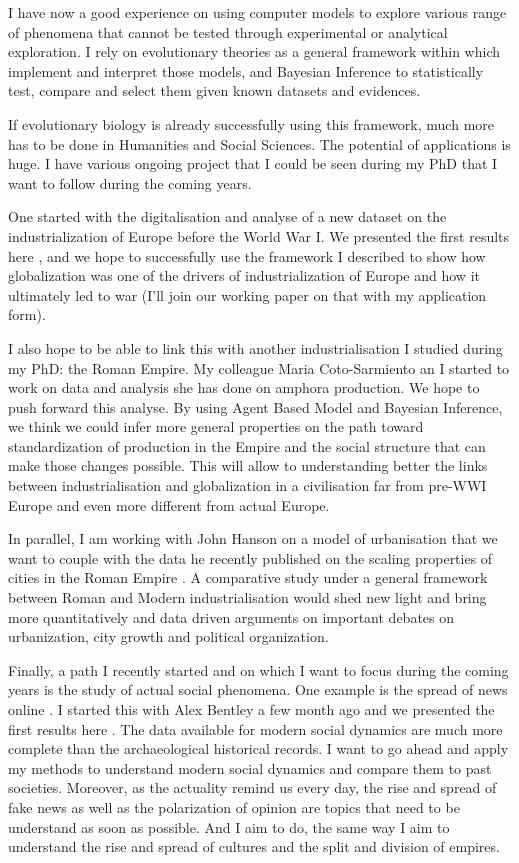\documentclass[10pt]{article}
\begin{document}
I have now a good experience on using computer models to explore various range of phenomena that cannot be tested through experimental or analytical exploration. I rely on evolutionary theories as a general framework within which implement and interpret those models, and Bayesian Inference to statistically test, compare and select them given known datasets and evidences.

If evolutionary biology is already successfully using this framework, much more has to be done in Humanities and Social Sciences. The potential of applications is huge. I have various ongoing project that I  could be seen   during my PhD that I want to follow during the coming years.

One started with the digitalisation and analyse of a new dataset on the industrialization of Europe before the World War I. We presented the first results here \cite{carrignon2016patternsinglobalization}, and we hope to successfully use the framework I described to show how globalization was one of the drivers of industrialization of Europe and how it ultimately led to war (I'll join our working paper on that with my application form).

I also hope to be able to link this with another industrialisation I studied during my PhD: the Roman Empire. My colleague Maria Coto-Sarmiento an I started to work on data and analysis she has done on amphora production\cite{COTOSARMIENTO2018117}. We hope to push forward this analyse. By using Agent Based Model and Bayesian Inference, we think we could infer more general properties on the path toward standardization of production in the Empire and the social structure that can make those changes possible.  This will allow to understanding better the links between industrialisation and globalization in a civilisation far from pre-WWI Europe and even more different from actual Europe.

In parallel, I am working with John Hanson on a model of urbanisation that we want to couple with the data he recently published on the scaling properties of cities in the Roman Empire \cite{Hanson20170367}. A comparative study under a general framework between Roman and Modern industrialisation would shed new light and bring more quantitatively and data driven arguments on important debates on urbanization, city growth and political organization.

Finally, a path I recently started and on which I want to focus during the coming years is the study of actual social phenomena.  One example is the spread of news online \cite{carrignon2018}. I started this with Alex Bentley a few month ago and we presented the first results here \cite{carrignon2018}. The data available for modern social dynamics are much more complete than the archaeological historical records.  I want to go ahead and apply my methods to understand modern social dynamics and compare them to past societies.  Moreover, as the actuality remind us every day, the rise and spread of fake news as well as the polarization of opinion are topics that need to be understand as soon as possible.  And I aim to do, the same way I aim to understand the rise and spread of cultures and the split and division of empires. 
\end{document}
